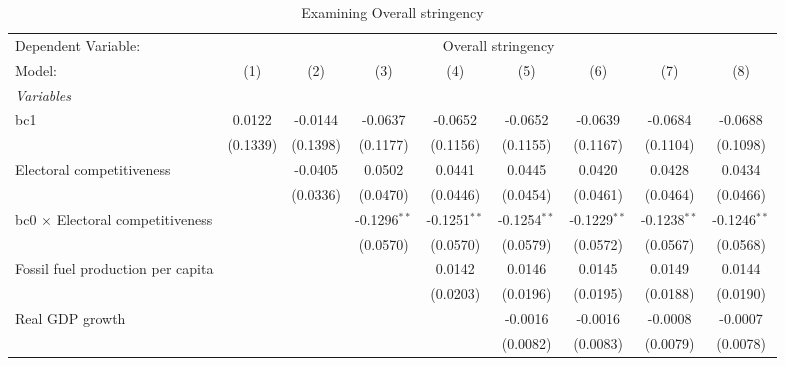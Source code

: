 
\begin{table}[htbp]
   \caption{Examining Overall stringency}
   \centering
   \begin{tabular}{lcccccccc}
      \tabularnewline \midrule \midrule
      Dependent Variable: & \multicolumn{8}{c}{Overall stringency}\\
      Model:                                  & (1)      & (2)      & (3)            & (4)            & (5)            & (6)            & (7)            & (8)\\  
      \midrule
      \emph{Variables}\\
      bc1                                     & 0.0122   & -0.0144  & -0.0637        & -0.0652        & -0.0652        & -0.0639        & -0.0684        & -0.0688\\   
                                              & (0.1339) & (0.1398) & (0.1177)       & (0.1156)       & (0.1155)       & (0.1167)       & (0.1104)       & (0.1098)\\   
      Electoral competitiveness               &          & -0.0405  & 0.0502         & 0.0441         & 0.0445         & 0.0420         & 0.0428         & 0.0434\\   
                                              &          & (0.0336) & (0.0470)       & (0.0446)       & (0.0454)       & (0.0461)       & (0.0464)       & (0.0466)\\   
      bc0 $\times$ Electoral competitiveness  &          &          & -0.1296$^{**}$ & -0.1251$^{**}$ & -0.1254$^{**}$ & -0.1229$^{**}$ & -0.1238$^{**}$ & -0.1246$^{**}$\\   
                                              &          &          & (0.0570)       & (0.0570)       & (0.0579)       & (0.0572)       & (0.0567)       & (0.0568)\\   
      Fossil fuel production per capita       &          &          &                & 0.0142         & 0.0146         & 0.0145         & 0.0149         & 0.0144\\   
                                              &          &          &                & (0.0203)       & (0.0196)       & (0.0195)       & (0.0188)       & (0.0190)\\   
      Real GDP growth                         &          &          &                &                & -0.0016        & -0.0016        & -0.0008        & -0.0007\\   
                                              &          &          &                &                & (0.0082)       & (0.0083)       & (0.0079)       & (0.0078)\\   

\end{tabular}
\end{table}
